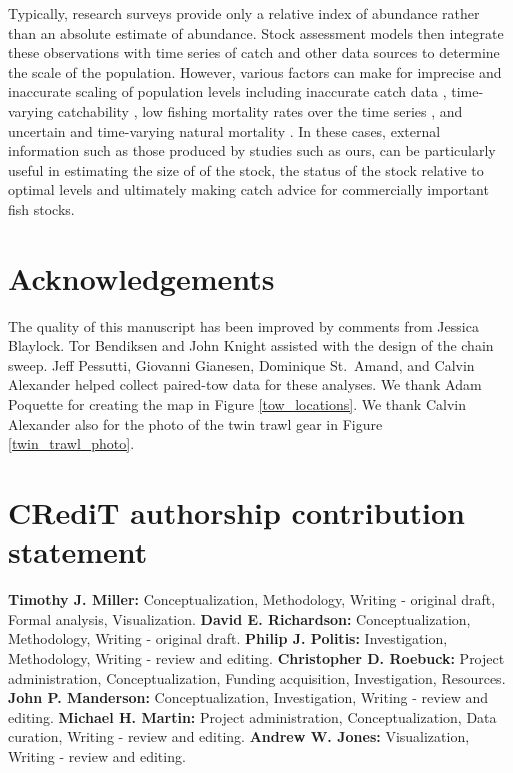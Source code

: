 \documentclass[
  12pt,
]{article}
\begin{document}
Typically, research surveys provide only a relative index of abundance
rather than an absolute estimate of abundance. Stock assessment models
then integrate these observations with time series of catch and other
data sources to determine the scale of the population. However, various
factors can make for imprecise and inaccurate scaling of population
levels including inaccurate catch data \citep{cadigan16}, time-varying
catchability \citep{wilbergetal09}, low fishing mortality rates over the
time series \citep{adamsetal15}, and uncertain and time-varying natural
mortality \citep{stocketal21}. In these cases, external information such
as those produced by studies such as ours, can be particularly useful in
estimating the size of of the stock, the status of the stock relative to
optimal levels and ultimately making catch advice for commercially
important fish stocks.

\hypertarget{acknowledgements}{%
\section*{Acknowledgements}\label{acknowledgements}}

The quality of this manuscript has been improved by comments from
Jessica Blaylock. Tor Bendiksen and John Knight assisted with the design
of the chain sweep. Jeff Pessutti, Giovanni Gianesen, Dominique
St.~Amand, and Calvin Alexander helped collect paired-tow data for these
analyses. We thank Adam Poquette for creating the map in Figure
\ref{tow_locations}. We thank Calvin Alexander also for the photo of the
twin trawl gear in Figure \ref{twin_trawl_photo}.

\hypertarget{credit-authorship-contribution-statement}{%
\section*{CRediT authorship contribution
statement}\label{credit-authorship-contribution-statement}}

\textbf{Timothy J. Miller:} Conceptualization, Methodology, Writing -
original draft, Formal analysis, Visualization. \textbf{David E.
Richardson:} Conceptualization, Methodology, Writing - original draft.
\textbf{Philip J. Politis:} Investigation, Methodology, Writing - review
and editing. \textbf{Christopher D. Roebuck:} Project administration,
Conceptualization, Funding acquisition, Investigation, Resources.
\textbf{John P. Manderson:} Conceptualization, Investigation, Writing -
review and editing. \textbf{Michael H. Martin:} Project administration,
Conceptualization, Data curation, Writing - review and editing.
\textbf{Andrew W. Jones:} Visualization, Writing - review and editing.
\end{document}
